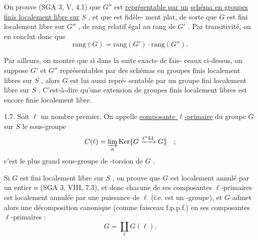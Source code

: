 
On prouve (SGA 3, V, 4.1) que $G''$ est \uline{représentable par un}
\margin{$\pi$} \uline{schéma en groupes finis localement libre sur} $S$ , et que \inserted{$\pi$} est fidèle-%
ment plat, de sorte que $G$ est fini localement libre sur $G''$ , de rang
relatif égal au rang de $G'$ . Par transitivité, on en conclut donc que
\[ \mathrm{rang}(G) = \mathrm{rang}(G')\cdot\mathrm{rang}(G'') . \]

Par ailleurs, on montre que si dans la suite exacte de fais-%
ceaux ci-dessus, on suppose $G'$ et $G''$ représentables par des schémas
en groupes finis localement libres sur $S$ , alors $G$ est lui aussi repré-%
sentable par un groupe fini localement libre sur $S$ . C'est-à-dire qu'une
extension de groupes finis localement libres est encore finie localement
libre.

1.7. Soit $\ell$ un nombre premier. On appelle \uline{composante $\ell$-primaire}
du groupe $G$ sur $S$ le sous-groupe
\[ C(\ell) = \varinjlim_{n} \mathrm{Ker}\{G \xrightarrow{\ell^{n}\mathrm{Id}} G\} \quad ; \]
\margin{$\times$ $\ell$} c'est le plus grand sous-groupe de \hand{$\ell$}-torsion de $G$ .

Si $G$ est fini localement libre sur $S$ , on prouve que $G$ est
localement annulé par un entier $n$ (SGA 3, VIII, 7.3), et donc chacune de
ses composantes $\ell$-primaires est localement annulée par une puissance de $\ell$
\margin{$\times$ $\ell$} (i.e. est un \hand{$\ell$}-groupe), et $G$ admet alors une décomposition canonique
(comme faisceau f.p.p.f.) en ses composantes $\ell$-primaires :
\[ G = \coprod_{\ell} G(\ell) . \]

